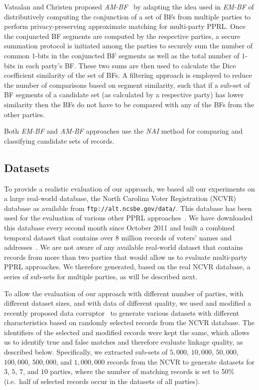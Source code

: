 \documentclass{sig-alternate}
\begin{document}
Vatsalan and Christen proposed \emph{AM-BF}~\cite{Vat14c,Vat16c} by
adapting the idea used in \emph{EM-BF}
of distributively computing
the conjunction of a set of BFs from multiple parties
to perform privacy-preserving approximate matching for multi-party PPRL.
Once the conjuncted BF segments are computed by the respective
parties, a secure summation protocol is initiated among the parties
to securely sum the number of common $1$-bits in the conjuncted 
BF segments as well as the total number of $1$-bits
in each party's BF. These two sums are then used to calculate
the Dice coefficient similarity of the set of BFs.
A filtering approach is employed to reduce the number of comparisons
based on segment similarity, such that if a sub-set of BF
segments of a candidate set (as calculated by a respective party)
has lower similarity then the 
BFs do not have to be compared with any of the BFs
from the other parties.

Both \emph{EM-BF} and \emph{AM-BF} approaches use the
\emph{NAI} method for comparing and classifying candidate sets
of records.

\subsection{Datasets}
\label{sec-datasets}

To provide a realistic evaluation of our approach, we based all our
experiments on a large real-world database, the North Carolina Voter
Registration (NCVR) database as available from
\texttt{ftp://alt.ncsbe.gov/data/}. This database has been used for the
evaluation of various other PPRL approaches~\cite{Dur13,Ran14,Ran15,Vat14c,Vat16c,Vat14}. We have
downloaded this database every second month since October 2011 and
built a combined temporal dataset that contains over 8 million records
of voters' names and addresses~\cite{Chr13NC}.
We are not aware of any available real-world dataset that contains
records from more than two parties that would allow us to evaluate 
multi-party PPRL approaches. We therefore generated, based on the real NCVR
database, a series of sub-sets for multiple parties, 
as will be described next.

To allow the evaluation of our approach with different number of
parties, with different dataset sizes, and with data of different
quality, we used and modified a recently proposed data
corruptor~\cite{Chr13b,Tra13} to generate various datasets with different
characteristics based on randomly selected records 
from the NCVR
database. 
The identifiers of the
selected and modified records were kept the same, 
which allows us to identify true and
false matches and therefore evaluate linkage quality, 
as described below.
Specifically, we extracted sub-sets of $5,000$, $10,000$,
$50,000$, $100,000$, $500,000$, and $1,000,000$ records from the NCVR
to generate datasets for $3$,
$5$, $7$, and $10$
parties, where
the number of matching records is set to 50\% (i.e.\ half of 
selected records occur in the datasets of all parties).
\end{document}
